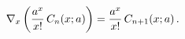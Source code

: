 \[\nabla_{x}\left(\frac{a^{x}}{x!}\mathop{C_{n}\/}\nolimits\!\left(x;a\right)%
\right)=\frac{a^{x}}{x!}\mathop{C_{n+1}\/}\nolimits\!\left(x;a\right).\]